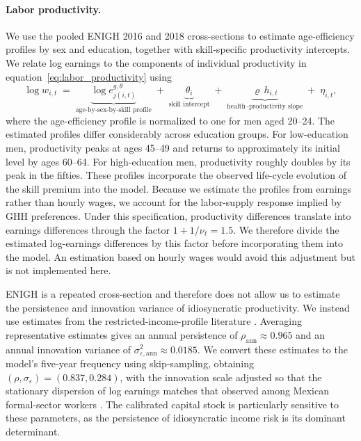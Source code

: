 \documentclass[12pt,a4paper]{article}
\begin{document}
\paragraph{Labor productivity.}
We use the pooled ENIGH 2016 and 2018 cross-sections to estimate age-efficiency profiles by sex and education, together with skill-specific productivity intercepts. We relate log earnings to the components of individual productivity in equation~\eqref{eq:labor_productivity} using
\begin{equation}
\label{eq:logwage_decomp}
\log w_{i,t} \;=\; \underbrace{\log e^{g,\theta}_{j(i,t)}}_{\text{age-by-sex-by-skill profile}} \;+\; \underbrace{\theta_{i}}_{\text{skill intercept}} \;+\; \underbrace{\varrho\, h_{i,t}}_{\text{health--productivity slope}} \;+\; \eta_{i,t},
\end{equation}
where the age-efficiency profile is normalized to one for men aged 20--24. The estimated profiles differ considerably across education groups. For low-education men, productivity peaks at ages 45--49 and returns to approximately its initial level by ages 60--64. For high-education men, productivity roughly doubles by its peak in the fifties. These profiles incorporate the observed life-cycle evolution of the skill premium into the model. Because we estimate the profiles from earnings rather than hourly wages, we account for the labor-supply response implied by GHH preferences. Under this specification, productivity differences translate into earnings differences through the factor $1+1/\nu_\ell=1.5$. We therefore divide the estimated log-earnings differences by this factor before incorporating them into the model. An estimation based on hourly wages would avoid this adjustment but is not implemented here.

ENIGH is a repeated cross-section and therefore does not allow us to estimate the persistence and innovation variance of idiosyncratic productivity. We instead use estimates from the restricted-income-profile literature \citep{StoreslettenTelmerYaron2004, Guvenen2009, HubbardSkinnerZeldes1994}. Averaging representative estimates gives an annual persistence of $\rho_{\mathrm{ann}}\approx0.965$ and an annual innovation variance of $\sigma^2_{\varepsilon,\mathrm{ann}}\approx0.0185$. We convert these estimates to the model's five-year frequency using skip-sampling, obtaining $(\rho,\sigma_\varepsilon)=(0.837,0.284)$, with the innovation scale adjusted so that the stationary dispersion of log earnings matches that observed among Mexican formal-sector workers \citep{Puggioni2022}. The calibrated capital stock is particularly sensitive to these parameters, as the persistence of idiosyncratic income risk is its dominant determinant.
\end{document}

